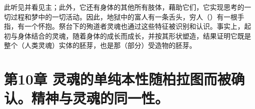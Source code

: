 此听见并看见主；此外，它还有身体的其他所有肢体，藉助它们，它实现思考的一切过程和梦中的一切活动。因此，地狱中的富人有一条舌头，穷人（）有一根手指，有一个怀抱。祭台下的殉道者灵魂也通过这些特征被识别和认识。事实上，起初与身体结合的灵魂，随着身体的成长而成长，并按其形状塑造，结果证明它既是整个（人类灵魂）实体的胚芽，也是那（部分）受造物的胚芽。\par


\section{第10章 灵魂的单纯本性随柏拉图而被确认。精神与灵魂的同一性。}

